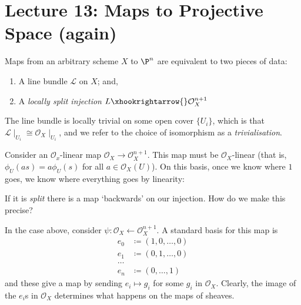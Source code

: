 \section{Lecture 13: Maps to Projective Space (again)}

\begin{theorem}\label{arb:morphism_to_Pn}
    Maps from an arbitrary scheme $X$ to $\P^n$ are equivalent to two pieces of data:
    \begin{enumerate}
        \item A line bundle $\mathcal{L}$ on $X$; and,
        \item A \emph{locally split injection} $L\xhookrightarrow{}\mathcal{O}_X^{n+1}$
    \end{enumerate}
\end{theorem}

The line bundle is locally trivial on some open cover $\{U_i\}$, which is that $\mathcal{L}\mid_{U_i}\cong\mathcal{O}_X\mid_{U_i}$, and we refer to the choice of isomorphism as a \emph{trivialisation}.

Consider an $\mathcal{O}_x$-linear map $\mathcal{O}_X\to\mathcal{O}_X^{n+1}$.
This map must be $\mathcal{O}_X$-linear (that is, $\phi_U(as)=a\phi_U(s)$ for all $a\in\mathcal{O}_X(U)$).
On this basis, once we know where $1$ goes, we know where everything goes by linearity:
\begin{figure}[H]
    \centering
\end{figure}

If it is \emph{split} there is a map `backwards' on our injection.
How do we make this precise?

In the case above, consider $\psi:\mathcal{O}_X\xleftarrow{}\mathcal{O}_X^{n+1}$.
A standard basis for this map is
\begin{align*}
    e_0&\coloneqq(1,0,\dots,0)\\
    e_1&\coloneqq(0,1,\dots,0)\\
    \dots\\
    e_{n}&\coloneqq(0,\dots,1)
\end{align*}
and these give a map by sending $e_i\mapsto g_i$ for some $g_i$ in $\mathcal{O}_X$.
Clearly, the image of the $e_i$s in $\mathcal{O}_X$ determines what happens on the maps of sheaves.


